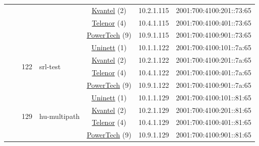 \begin{small}
\begin{center}
\begin{longtable}{|c|c|c|c|c|c|c|c|}
  &  &  &  & \multicolumn{2}{|c|}{\tiny{\href{http://kvantel.no}{Kvantel} (2)}} & \tiny{10.2.1.115} & \tiny{2001:700:4100:201::73:65} \\* \cline{5-5}\cline{6-6}\cline{7-7}\cline{8-8}
  &  &  &  & \multicolumn{2}{|c|}{\tiny{\href{https://www.telenor.no}{Telenor} (4)}} & \tiny{10.4.1.115} & \tiny{2001:700:4100:401::73:65} \\* \cline{5-5}\cline{6-6}\cline{7-7}\cline{8-8}
  &  &  &  & \multicolumn{2}{|c|}{\tiny{\href{http://www.powertech.no}{PowerTech} (9)}} & \tiny{10.9.1.115} & \tiny{2001:700:4100:901::73:65} \\* \cline{3-3}\cline{4-4}\cline{5-5}\cline{6-6}\cline{7-7}\cline{8-8}
  &  & \multirow{4}{*}{\tiny{122}} & \multicolumn{1}{|l|}{\multirow{4}{*}{\tiny{srl-test}}} & \multicolumn{2}{|c|}{\tiny{\href{https://www.uninett.no}{Uninett} (1)}} & \tiny{10.1.1.122} & \tiny{2001:700:4100:101::7a:65} \\* \cline{5-5}\cline{6-6}\cline{7-7}\cline{8-8}
  &  &  &  & \multicolumn{2}{|c|}{\tiny{\href{http://kvantel.no}{Kvantel} (2)}} & \tiny{10.2.1.122} & \tiny{2001:700:4100:201::7a:65} \\* \cline{5-5}\cline{6-6}\cline{7-7}\cline{8-8}
  &  &  &  & \multicolumn{2}{|c|}{\tiny{\href{https://www.telenor.no}{Telenor} (4)}} & \tiny{10.4.1.122} & \tiny{2001:700:4100:401::7a:65} \\* \cline{5-5}\cline{6-6}\cline{7-7}\cline{8-8}
  &  &  &  & \multicolumn{2}{|c|}{\tiny{\href{http://www.powertech.no}{PowerTech} (9)}} & \tiny{10.9.1.122} & \tiny{2001:700:4100:901::7a:65} \\* \cline{3-3}\cline{4-4}\cline{5-5}\cline{6-6}\cline{7-7}\cline{8-8}
  &  & \multirow{4}{*}{\tiny{129}} & \multicolumn{1}{|l|}{\multirow{4}{*}{\tiny{hu-multipath}}} & \multicolumn{2}{|c|}{\tiny{\href{https://www.uninett.no}{Uninett} (1)}} & \tiny{10.1.1.129} & \tiny{2001:700:4100:101::81:65} \\* \cline{5-5}\cline{6-6}\cline{7-7}\cline{8-8}
  &  &  &  & \multicolumn{2}{|c|}{\tiny{\href{http://kvantel.no}{Kvantel} (2)}} & \tiny{10.2.1.129} & \tiny{2001:700:4100:201::81:65} \\* \cline{5-5}\cline{6-6}\cline{7-7}\cline{8-8}
  &  &  &  & \multicolumn{2}{|c|}{\tiny{\href{https://www.telenor.no}{Telenor} (4)}} & \tiny{10.4.1.129} & \tiny{2001:700:4100:401::81:65} \\* \cline{5-5}\cline{6-6}\cline{7-7}\cline{8-8}
  &  &  &  & \multicolumn{2}{|c|}{\tiny{\href{http://www.powertech.no}{PowerTech} (9)}} & \tiny{10.9.1.129} & \tiny{2001:700:4100:901::81:65} \\* \cline{3-3}\cline{4-4}\cline{5-5}\cline{6-6}\cline{7-7}\cline{8-8}

\end{longtable}
\end{center}
\end{small}
